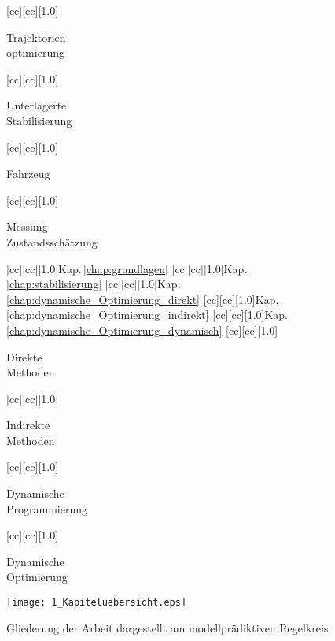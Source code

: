 \begin{figure}[h]
	[cc][cc][1.0]{\parbox[c]{7cm}{\begin{center} Trajektorien- \\ optimierung \end{center}}}
	[cc][cc][1.0]{\parbox[c]{7cm}{\begin{center} Unterlagerte \\ Stabilisierung \end{center}}}
	[cc][cc][1.0]{\parbox[c]{7cm}{\begin{center} Fahrzeug \end{center}}}
		[cc][cc][1.0]{\parbox[c]{7cm}{\begin{center} Messung \\ Zustandsschätzung \end{center}}}
		[cc][cc][1.0]{Kap.\,\ref{chap:grundlagen}}
		[cc][cc][1.0]{Kap.\,\ref{chap:stabilisierung}}
		[cc][cc][1.0]{Kap.\,\ref{chap:dynamische_Optimierung_direkt}}
		[cc][cc][1.0]{Kap.\,\ref{chap:dynamische_Optimierung_indirekt}}
		[cc][cc][1.0]{Kap.\,\ref{chap:dynamische_Optimierung_dynamisch}}
		[cc][cc][1.0]{\parbox[c]{7cm}{\begin{center} Direkte \\ Methoden \end{center}}}
		[cc][cc][1.0]{\parbox[c]{7cm}{\begin{center} Indirekte \\ Methoden \end{center}}}
		[cc][cc][1.0]{\parbox[c]{7cm}{\begin{center} Dynamische \\ Programmierung \end{center}}}
		[cc][cc][1.0]{\parbox[c]{7cm}{\begin{center} Dynamische \\ Optimierung \end{center}}}
	\centering
	\texttt{[image: 1\_Kapiteluebersicht.eps]}
	\caption{Gliederung der Arbeit dargestellt am modellprädiktiven Regelkreis}
	\label{fig:Kapiteluebersicht}%
\end{figure}

